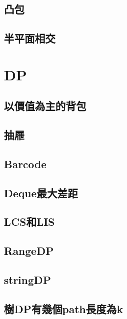     \subsection{凸包}
        
        
    \subsection{半平面相交}
        
    \columnbreak

\section{DP}
    \subsection{以價值為主的背包}
        
    \subsection{抽屜}
        
    \subsection{Barcode}
        
    \subsection{Deque最大差距}
        
    \subsection{LCS和LIS}
        
    \subsection{RangeDP}
        
    \subsection{stringDP}
        
    \subsection{樹DP有幾個path長度為k}
        
